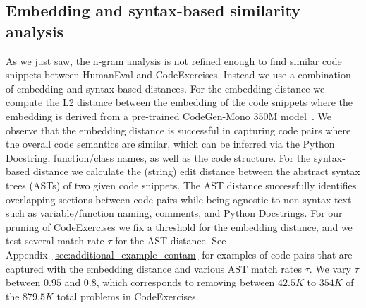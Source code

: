 \subsection{Embedding and syntax-based similarity analysis}
As we just saw, the n-gram analysis is not refined enough to find similar code snippets between HumanEval and CodeExercises. Instead we use a combination of embedding and syntax-based distances. For the embedding distance we compute the L2 distance between the embedding of the code snippets where the embedding is derived from a pre-trained CodeGen-Mono 350M model~\cite{nijkamp2022codegen}. We observe that the embedding distance is successful in capturing code pairs where the overall code semantics are similar, which can be inferred via the Python Docstring, function/class names, as well as the code structure. For the syntax-based distance we calculate the (string) edit distance between the abstract syntax trees (ASTs) of two given code snippets. The AST distance successfully identifies overlapping sections between code pairs while being agnostic to non-syntax text such as variable/function naming, comments, and Python Docstrings. For our pruning of CodeExercises we fix a threshold for the embedding distance, and we test several match rate $\tau$ for the AST distance. See Appendix~\ref{sec:additional_example_contam} for examples of code pairs that are captured with the embedding distance and various AST match rates $\tau$. We vary $\tau$ between $0.95$ and $0.8$, which corresponds to removing between $42.5K$ to $354K$ of the $879.5K$ total problems in CodeExercises.


